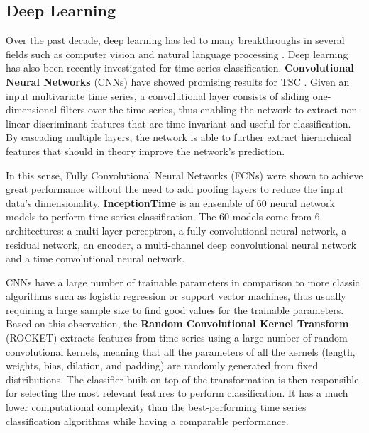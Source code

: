 \subsection{Deep Learning}

Over the past decade, deep learning has led to many breakthroughs in several fields such as computer vision \cite{fawaz2019deep} and natural language processing \cite{floridi2020gpt}. Deep learning has also been recently investigated for time series classification.
\textbf{Convolutional Neural Networks} (CNNs) have showed promising results for TSC \cite{wang2017time}. Given an input multivariate time series, a convolutional layer consists of sliding one-dimensional filters over the time series, thus enabling the network to extract non-linear discriminant features that are time-invariant and useful for classification. By cascading multiple layers, the network is able to further extract hierarchical features that should in theory improve the network's prediction. 

In this sense, Fully Convolutional Neural Networks (FCNs) \cite{wang2017time} were shown to achieve great performance without the need to add pooling layers to reduce the input data's dimensionality. 
\textbf{InceptionTime} \cite{fawaz2019deep} is an ensemble of 60 neural network models to perform time series classification. The 60 models come from 6 architectures: a multi-layer perceptron, a fully convolutional neural network, a residual network, an encoder, a multi-channel deep convolutional neural network and a time convolutional neural network.

CNNs have a large number of trainable parameters in comparison to more classic algorithms such as logistic regression or support vector machines, thus usually requiring a large sample size to find good values for the trainable parameters. Based on this observation, the \textbf{Random Convolutional Kernel Transform} (ROCKET) \cite{dempster2020rocket} extracts features from time series using a large number of random convolutional kernels, meaning that all the parameters of all the kernels (length, weights, bias, dilation, and padding) are randomly generated from fixed distributions. 
The classifier built on top of the transformation is then responsible for selecting the most relevant features to perform classification. It has a much lower computational complexity than the best-performing time series classification algorithms while having a comparable performance.


